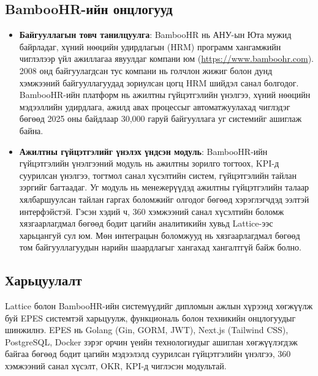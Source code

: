 \subsection{BambooHR-ийн онцлогууд}
\begin{itemize}
    \item \textbf{Байгууллагын товч танилцуулга}: BambooHR нь АНУ-ын Юта мужид байрладаг, хүний нөөцийн удирдлагын (HRM) программ хангамжийн чиглэлээр 
    үйл ажиллагаа явуулдаг компани юм (\url{https://www.bamboohr.com}). 2008 онд байгуулагдсан тус компани нь голчлон жижиг болон дунд хэмжээний байгууллагуудад 
    зориулсан цогц HRM шийдэл санал болгодог. BambooHR-ийн платформ нь ажилтны гүйцэтгэлийн үнэлгээ, хүний нөөцийн мэдээллийн удирдлага, ажилд авах процессыг 
    автоматжуулахад чиглэдэг бөгөөд 2025 оны байдлаар 30,000 гаруй байгууллага уг системийг ашиглаж байна.
    \item \textbf{Ажилтны гүйцэтгэлийг үнэлэх үндсэн модуль}: BambooHR-ийн гүйцэтгэлийн үнэлгээний модуль нь ажилтны зорилго тогтоох, KPI-д суурилсан үнэлгээ, 
    тогтмол санал хүсэлтийн систем, гүйцэтгэлийн тайлан зэргийг багтаадаг. Уг модуль нь менежерүүдэд ажилтны гүйцэтгэлийн талаар хялбаршуулсан тайлан гаргах 
    боломжийг олгодог бөгөөд хэрэглэгчдэд ээлтэй интерфэйстэй. Гэсэн хэдий ч, 360 хэмжээний санал хүсэлтийн боломж хязгаарлагдмал бөгөөд бодит цагийн аналитикийн 
    хувьд Lattice-ээс харьцангуй сул юм. Мөн интеграцын боломжууд нь хязгаарлагдмал бөгөөд том байгууллагуудын нарийн шаардлагыг хангахад хангалтгүй байж болно.
\end{itemize}

\subsection{Харьцуулалт}
Lattice болон BambooHR-ийн системүүдийг дипломын ажлын хүрээнд хөгжүүлж буй EPES системтэй харьцуулж, функциональ болон техникийн онцлогуудыг шинжилнэ. EPES нь 
Golang (Gin, GORM, JWT), Next.js (Tailwind CSS), PostgreSQL, Docker зэрэг орчин үеийн технологиудыг ашиглан хөгжүүлэгдэж байгаа бөгөөд бодит цагийн мэдээлэлд 
суурилсан гүйцэтгэлийн үнэлгээ, 360 хэмжээний санал хүсэлт, OKR, KPI-д чиглэсэн модультай.

